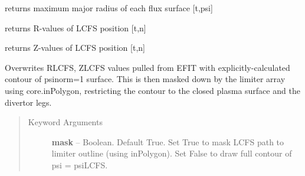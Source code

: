 \documentclass[letterpaper,10pt,english]{sphinxmanual}
\begin{document}
\begin{fulllineitems}
\begin{fulllineitems}
\end{fulllineitems}


\begin{fulllineitems}
\label{eqtools:eqtools.EFIT.EFITTree.getRmidPsi}
returns maximum major radius of each flux surface {[}t,psi{]}

\end{fulllineitems}


\begin{fulllineitems}
\label{eqtools:eqtools.EFIT.EFITTree.getRLCFS}
returns R-values of LCFS position {[}t,n{]}

\end{fulllineitems}


\begin{fulllineitems}
\label{eqtools:eqtools.EFIT.EFITTree.getZLCFS}
returns Z-values of LCFS position {[}t,n{]}

\end{fulllineitems}


\begin{fulllineitems}
\label{eqtools:eqtools.EFIT.EFITTree.remapLCFS}
Overwrites RLCFS, ZLCFS values pulled from EFIT with explicitly-calculated contour
of psinorm=1 surface.  This is then masked down by the limiter array using core.inPolygon,
restricting the contour to the closed plasma surface and the divertor legs.
\begin{quote}\begin{description}
\item[{Keyword Arguments}] \leavevmode
\textbf{mask} --
Boolean.
Default True.  Set True to mask LCFS path to limiter outline (using inPolygon).
Set False to draw full contour of psi = psiLCFS.

\end{description}\end{quote}

\end{fulllineitems}


\end{fulllineitems}
\end{document}
